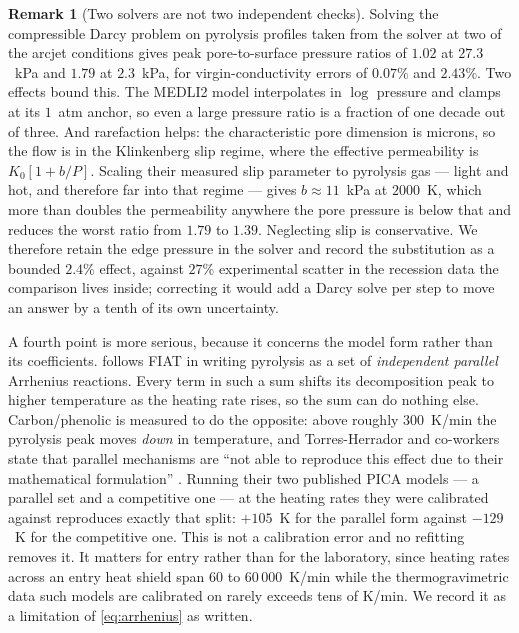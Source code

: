 \documentclass[11pt,a4paper]{article}
\theoremstyle{definition}
\newtheorem{remark}[theorem]{Remark}
\numberwithin{equation}{section}
\begin{document}
\begin{remark}[Two solvers are not two independent checks]
Solving the compressible Darcy problem on pyrolysis profiles taken from the solver at two of the arcjet conditions gives peak pore-to-surface pressure ratios of $1.02$ at $27.3$~kPa and $1.79$ at $2.3$~kPa, for virgin-conductivity errors of $0.07\%$ and $2.43\%$. Two effects bound this. The MEDLI2 model interpolates in $\log$ pressure and clamps at its $1$~atm anchor, so even a large pressure ratio is a fraction of one decade out of three. And rarefaction helps: the characteristic pore dimension is microns, so the flow is in the Klinkenberg slip regime, where the effective permeability is $K_0[1 + b/P]$. Scaling their measured slip parameter to pyrolysis gas --- light and hot, and therefore far into that regime --- gives $b \approx 11$~kPa at $2000$~K, which more than doubles the permeability anywhere the pore pressure is below that and reduces the worst ratio from $1.79$ to $1.39$. Neglecting slip is conservative. We therefore retain the edge pressure in the solver and record the substitution as a bounded $2.4\%$ effect, against $27\%$ experimental scatter in the recession data the comparison lives inside; correcting it would add a Darcy solve per step to move an answer by a tenth of its own uncertainty.

A fourth point is more serious, because it concerns the model form rather than its coefficients.  follows FIAT in writing pyrolysis as a set of \emph{independent parallel} Arrhenius reactions. Every term in such a sum shifts its decomposition peak to higher temperature as the heating rate rises, so the sum can do nothing else. Carbon/phenolic is measured to do the opposite: above roughly $300$~K/min the pyrolysis peak moves \emph{down} in temperature, and Torres-Herrador and co-workers state that parallel mechanisms are ``not able to reproduce this effect due to their mathematical formulation'' \cite{torresherrador2020}. Running their two published PICA models --- a parallel set \cite{torresherrador2019} and a competitive one \cite{torresherrador2020} --- at the heating rates they were calibrated against reproduces exactly that split: $+105$~K for the parallel form against $-129$~K for the competitive one. This is not a calibration error and no refitting removes it. It matters for entry rather than for the laboratory, since heating rates across an entry heat shield span $60$ to $60\,000$~K/min while the thermogravimetric data such models are calibrated on rarely exceeds tens of K/min. We record it as a limitation of \cref{eq:arrhenius} as written.


\end{remark}
\end{document}
